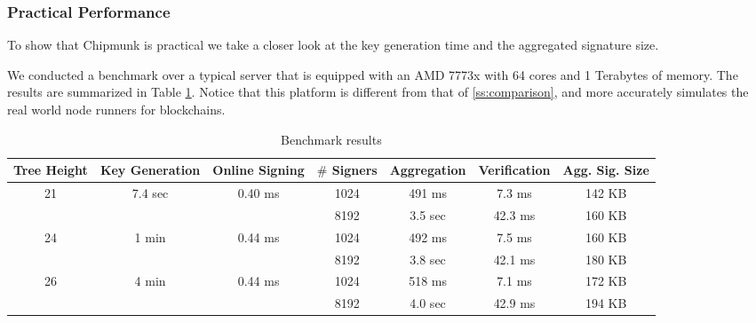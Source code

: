 \subsubsection{Practical Performance}
To show that Chipmunk is practical we take a closer look at the key generation time and the aggregated signature size.

We conducted a benchmark over a typical server that is equipped with an AMD 7773x with
64 cores and 1 Terabytes of memory.
The results are summarized in Table \ref{tab:bench_results}.
Notice that this platform is different from that of \autoref{ss:comparison},
and more accurately simulates the real world node runners for blockchains.

\begin{table}[t]\centering
  \begin{tabular}{ccccccc}
      Tree Height         & Key Generation            & Online Signing\footnotemark        
      & $\#$ Signers  
                                                                                            &  Aggregation & Verification  & Agg. Sig. Size  \\ \toprule
      \multirow{2}{*}{21} & \multirow{2}{*}{7.4 sec}  & \multirow{2}{*}{0.40 ms}  & 1024    &   491 ms     &  7.3 ms       & 142 KB     \\%
                          &                           &                           & 8192    &   3.5 sec    &  42.3 ms      & 160 KB     \\\hline

      \multirow{2}{*}{24} & \multirow{2}{*}{1 min}    & \multirow{2}{*}{0.44 ms}  & 1024    &   492 ms     &  7.5 ms       & 160 KB     \\%
                          &                           &                           & 8192    &   3.8 sec    &  42.1 ms      & 180 KB     \\\hline

      \multirow{2}{*}{26} & \multirow{2}{*}{  4 min}  & \multirow{2}{*}{0.44 ms}  & 1024    &   518 ms     &  7.1 ms       & 172 KB     \\%
                          &                           &                           & 8192    &   4.0 sec    &  42.9 ms      & 194 KB     \\\bottomrule

  \end{tabular}\\
  \caption{Benchmark results}
  \label{tab:bench_results}
\end{table}

